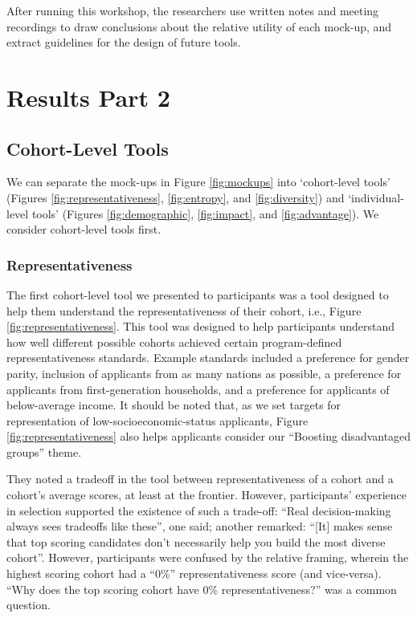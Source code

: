 After running this workshop, the researchers use written notes and meeting recordings to draw conclusions about the relative utility of each mock-up, and extract guidelines for the design of future tools.

\section{Results Part 2}
\subsection{Cohort-Level Tools}
We can separate the mock-ups in Figure \ref{fig:mockups} into `cohort-level tools' (Figures \ref{fig:representativeness}, \ref{fig:entropy}, and \ref{fig:diversity}) and `individual-level tools' (Figures \ref{fig:demographic}, \ref{fig:impact}, and \ref{fig:advantage}). We consider cohort-level tools first.

\subsubsection{Representativeness}
The first cohort-level tool we presented to participants was a tool designed to help them understand the representativeness of their cohort, i.e., Figure \ref{fig:representativeness}. This tool was designed to help participants understand how well different possible cohorts achieved certain program-defined representativeness standards. Example standards included a preference for gender parity, inclusion of applicants from as many nations as possible, a preference for applicants from first-generation households, and a preference for applicants of below-average income. It should be noted that, as we set targets for representation of low-socioeconomic-status applicants, Figure \ref{fig:representativeness} also helps applicants consider our ``Boosting disadvantaged groups'' theme.

They noted a tradeoff in the tool between representativeness of a cohort and a cohort's average scores, at least at the frontier. However, participants' experience in selection supported the existence of such a trade-off: ``Real decision-making always sees tradeoffs like these'', one said; another remarked: ``[It] makes sense that top scoring candidates don't necessarily help you build the most diverse cohort''. However, participants were confused by the relative framing, wherein the highest scoring cohort had a ``0\%'' representativeness score (and vice-versa). ``Why does the top scoring cohort have 0\% representativeness?'' was a common question.

